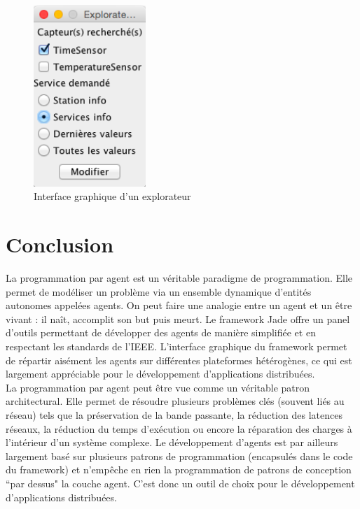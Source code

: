 \documentclass[conference]{IEEEtran}
\begin{document}
\begin{figure}[h]
\centering
\includegraphics[width=120pt]{images/explorer.png}
\caption{Interface graphique d'un explorateur}
\label{fig:explorer}
\end{figure}

\section{Conclusion}

La programmation par agent est un véritable paradigme de programmation. Elle permet de modéliser un problème via un ensemble dynamique d'entités autonomes appelées agents. On peut faire une analogie entre un agent et un être vivant : il naît, accomplit son but puis meurt. Le framework Jade offre un panel d'outils permettant de développer des agents de manière simplifiée et en respectant les standards de l'IEEE. L'interface graphique du framework permet de répartir aisément les agents sur différentes plateformes hétérogènes, ce qui est largement appréciable pour le développement d'applications distribuées.\\

La programmation par agent peut être vue comme un véritable patron architectural. Elle permet de résoudre plusieurs problèmes clés (souvent liés au réseau) tels que la préservation de la bande passante, la réduction des latences réseaux, la réduction du temps d'exécution ou encore la réparation des charges à l'intérieur d'un système complexe. Le développement d'agents est par ailleurs largement basé sur plusieurs patrons de programmation (encapsulés dans le code du framework) et n'empêche en rien la programmation de patrons de conception ``par dessus" la couche agent. C'est donc un outil de choix pour le développement d'applications distribuées.\\
\end{document}
